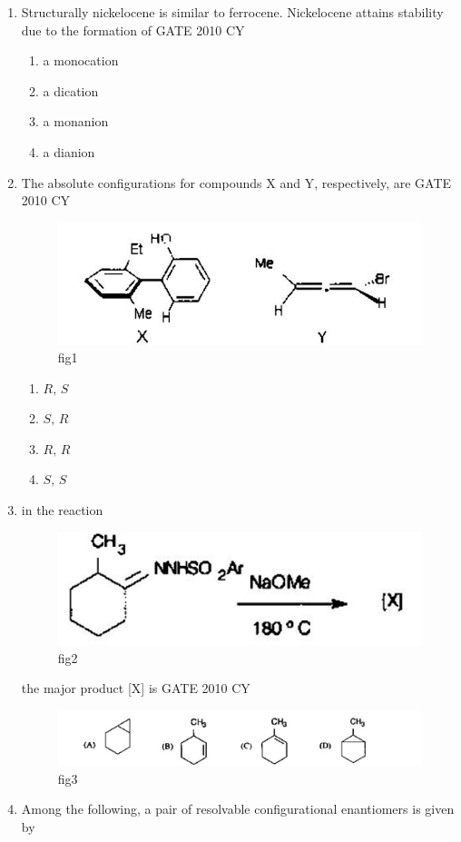 \documentclass[journal,12pt,onecolumn]{IEEEtran}
\theoremstyle{remark}
\begin{document}
\begin{enumerate}
\item Structurally nickelocene is similar to ferrocene. Nickelocene attains stability due to the formation of
\hfill{GATE 2010 CY}
\begin{multicols}{2}
\begin{enumerate}
    \item a monocation
    \item a dication
    \item a monanion
    \item a dianion
\end{enumerate}
\end{multicols}
\item The absolute configurations for compounds X and Y, respectively, are
\hfill{GATE 2010 CY}
\begin{figure}[H]
    \centering
    \includegraphics[width=0.5\linewidth]{figs/Q.9.png}
    \caption{fig1}
    \label{fig:figs/Q.9.png}
\end{figure}

\begin{multicols}{2}
\begin{enumerate}
    \item $R,\,S$
    \item $S,\,R$
    \item $R,\,R$
    \item $S,\,S$
\end{enumerate}
\end{multicols}
\item in the reaction
\begin{figure}[H]
    \centering
    \includegraphics[width=0.5\linewidth]{figs/Q.10.1.png}
    \caption{fig2}
    \label{fig:figs/Q.10.1.png}
\end{figure}
the major product [X] is
\hfill{GATE 2010 CY}
\begin{figure}[H]
    \centering
    \includegraphics[width=0.75\linewidth]{figs/Q.10.2.png}
    \caption{fig3}
    \label{fig:figs/Q.10.2.png}
\end{figure}
\item Among the following, a pair of resolvable configurational enantiomers is given by


\end{enumerate}
\end{document}
